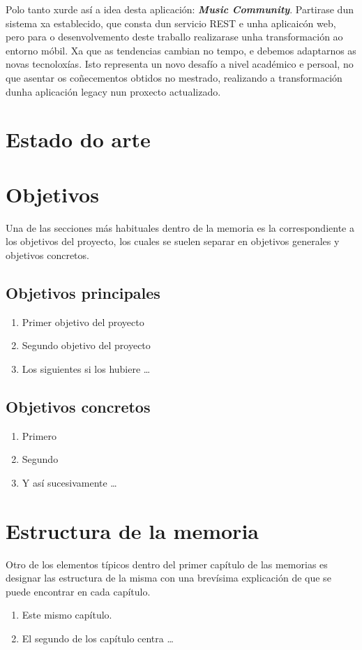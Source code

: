Polo tanto xurde así a idea desta aplicación: \textbf{\textit{Music Community}}. Partirase dun sistema xa establecido, que consta dun servicio REST e unha aplicaicón web, pero para o desenvolvemento deste traballo realizarase unha transformación ao entorno móbil. Xa que as tendencias cambian no tempo, e debemos adaptarnos as novas tecnoloxías. Isto representa un novo desafío a nivel académico e persoal, no que asentar os coñecementos obtidos no mestrado, realizando a transformación dunha aplicación legacy nun proxecto actualizado.

\section{Estado do arte}


\section{Objetivos}
\label{sec:objetivos}
Una de las secciones más habituales dentro de la memoria es la correspondiente a los objetivos del proyecto, los cuales se suelen separar en objetivos generales y objetivos concretos.  

\subsection{Objetivos principales}

\begin{enumerate}[label={\textbf{Objetivo \arabic*:}},leftmargin=2.5cm,labelindent=\parindent]
    \item Primer objetivo del proyecto
    \item Segundo objetivo del proyecto
    \item Los siguientes si los hubiere \ldots
\end{enumerate}

\subsection{Objetivos concretos}
\begin{enumerate}[label={\textbf{Objetivo Concreto \arabic*:}},leftmargin=4.5cm,labelindent=\parindent]
    \item Primero
    \item Segundo 
    \item Y así sucesivamente \ldots
\end{enumerate}


\section{Estructura de la memoria}
Otro de los elementos típicos dentro del primer capítulo de las memorias es designar las estructura de la misma con una brevísima  explicación de que se puede encontrar en cada capítulo.

\begin{enumerate}[label={Capítulo \arabic*},leftmargin=2.5cm]
\item Este mismo capítulo.
\item El segundo de los capítulo centra \ldots
\end{enumerate}

